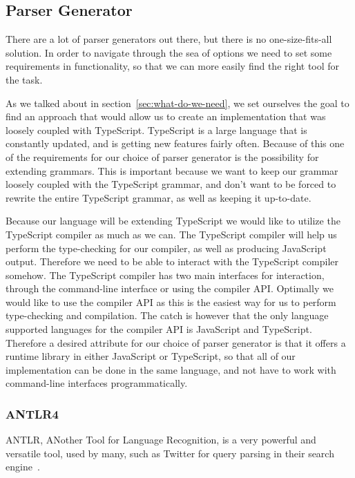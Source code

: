 

\subsection{Parser Generator}\label{subsec:parser-generator}

There are a lot of parser generators out there, but there is no one-size-fits-all solution.
In order to navigate through the sea of options we need to set some requirements in functionality, so that we can more easily find the right tool for the task.

As we talked about in section~\vref{sec:what-do-we-need}, we set ourselves the goal to find an approach that would allow us to create an implementation that was loosely coupled with TypeScript.
TypeScript is a large language that is constantly updated, and is getting new features fairly often.
Because of this one of the requirements for our choice of parser generator is the possibility for extending grammars.
This is important because we want to keep our grammar loosely coupled with the TypeScript grammar, and don't want to be forced to rewrite the entire TypeScript grammar, as well as keeping it up-to-date.

Because our language will be extending TypeScript we would like to utilize the TypeScript compiler as much as we can.
The TypeScript compiler will help us perform the type-checking for our compiler, as well as producing JavaScript output.
Therefore we need to be able to interact with the TypeScript compiler somehow.
The TypeScript compiler has two main interfaces for interaction, through the command-line interface or using the compiler API\@.
Optimally we would like to use the compiler API as this is the easiest way for us to perform type-checking and compilation.
The catch is however that the only language supported languages for the compiler API is JavaScript and TypeScript.
Therefore a desired attribute for our choice of parser generator is that it offers a runtime library in either JavaScript or TypeScript, so that all of our implementation can be done in the same language, and not have to work with command-line interfaces programmatically.

\subsubsection{ANTLR4}\label{subsubsec:antlr}

ANTLR, ANother Tool for Language Recognition, is a very powerful and versatile tool, used by many, such as Twitter for query parsing in their search engine~\cite{Terence2012}.


